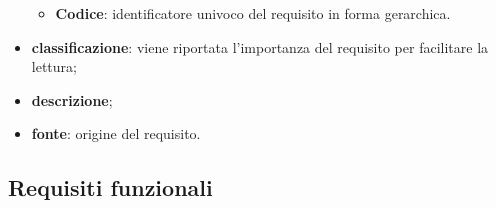 \begin{itemize}
\begin{itemize}
            \item \textbf{Codice}: identificatore univoco del 				requisito in forma gerarchica.
        \end{itemize}

		
        \item \textbf{classificazione}: viene riportata 						l'importanza del requisito per facilitare la 						lettura;
        \item \textbf{descrizione};
        \item \textbf{fonte}: origine del requisito.
    \end{itemize}

\newpage

\subsection{Requisiti funzionali}
    
